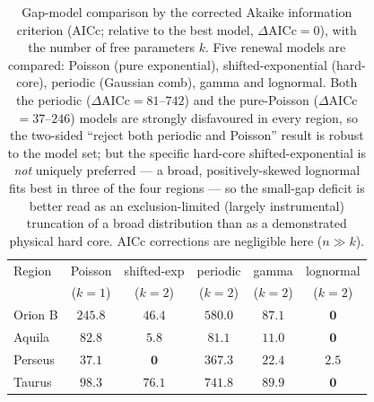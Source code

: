 \documentclass[usenatbib,twoside,twocolumn]{mnras}
\begin{document}
\begin{table}
\caption{Gap-model comparison by the corrected Akaike information criterion (AICc; relative to the best model, $\Delta$AICc$=0$), with the number of free parameters $k$. Five renewal models are compared: Poisson (pure exponential), shifted-exponential (hard-core), periodic (Gaussian comb), gamma and lognormal. Both the periodic ($\Delta$AICc$=81$--$742$) and the pure-Poisson ($\Delta$AICc$=37$--$246$) models are strongly disfavoured in every region, so the two-sided ``reject both periodic and Poisson'' result is robust to the model set; but the specific hard-core shifted-exponential is \emph{not} uniquely preferred --- a broad, positively-skewed lognormal fits best in three of the four regions --- so the small-gap deficit is better read as an exclusion-limited (largely instrumental) truncation of a broad distribution than as a demonstrated physical hard core. AICc corrections are negligible here ($n\gg k$).}
\label{tab:aic}
\footnotesize
\setlength{\tabcolsep}{3pt}
\begin{tabular}{lccccc}
\toprule
Region & Poisson & shifted-exp & periodic & gamma & lognormal \\
       & ($k{=}1$) & ($k{=}2$) & ($k{=}2$) & ($k{=}2$) & ($k{=}2$) \\
\midrule
Orion B & $245.8$ & $46.4$ & $580.0$ & $87.1$ & $\mathbf{0}$ \\
Aquila  & $82.8$  & $5.8$  & $81.1$  & $11.0$ & $\mathbf{0}$ \\
Perseus & $37.1$  & $\mathbf{0}$ & $367.3$ & $22.4$ & $2.5$ \\
Taurus  & $98.3$  & $76.1$ & $741.8$ & $89.9$ & $\mathbf{0}$ \\
\bottomrule
\end{tabular}
\end{table}
\end{document}
